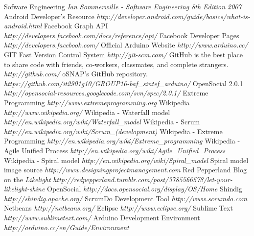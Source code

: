 \begin{thebibliography}{99}
 Sofware Engineering {\em Ian Sommerwille - Software Engineering 8th Edition 2007}
 Android Developer's Resource  {\em http://developer.android.com/guide/basics/what-is-android.html}
 Facebook Graph API {\em http://developers.facebook.com/docs/reference/api/}
 Facebook Developer Pages {\em http://developers.facebook.com/}
 Official Arduino Website {\em http://www.arduino.cc/}
 GIT Fast Version Control System {\em http://git-scm.com/}
 GitHub is the best place to share code with friends, co-workers, classmates, and complete strangers. {\em http://github.com/}
 oSNAP's GitHub repository. {\em https://github.com/it2901g10/GROUP10-baf_sintef_arduino/}
 OpenSocial 2.0.1 {\em http://opensocial-resources.googlecode.com/svn/spec/2.0.1/}
 Extreme Programming {\em http://www.extremeprogramming.org}
 Wikipedia {\em http://www.wikipedia.org/}
 Wikipedia - Waterfall model {\em http://en.wikipedia.org/wiki/Waterfall\_model}
 Wikipedia - Scrum {\em http://en.wikipedia.org/wiki/Scrum\_(development)}
 Wikipedia - Extreme Programming {\em http://en.wikipedia.org/wiki/Extreme\_programming}
 Wikipedia - Agile Unified Process {\em http://en.wikipedia.org/wiki/Agile\_Unified\_Process}
 Wikipedia - Spiral model {\em http://en.wikipedia.org/wiki/Spiral\_model}
 Spiral model image source {\em http://www.designingprojectmanagement.com}
 Red Pepperland Blog on the \emph{Likelight} {\em http://redpepperland.tumblr.com/post/3785566578/let-your-likelight-shine}
 OpenSocial {\em http://docs.opensocial.org/display/OS/Home}
 Shindig {\em http://shindig.apache.org/}
 ScrumDo Development Tool {\em http://www.scrumdo.com}
 Netbeans {\em http://netbeans.org/}
 Eclipse {\em http://www.eclipse.org/}
 Sublime Text {\em http://www.sublimetext.com/}
 Arduino Development Environment {\em http://arduino.cc/en/Guide/Environment}

\end{thebibliography}
